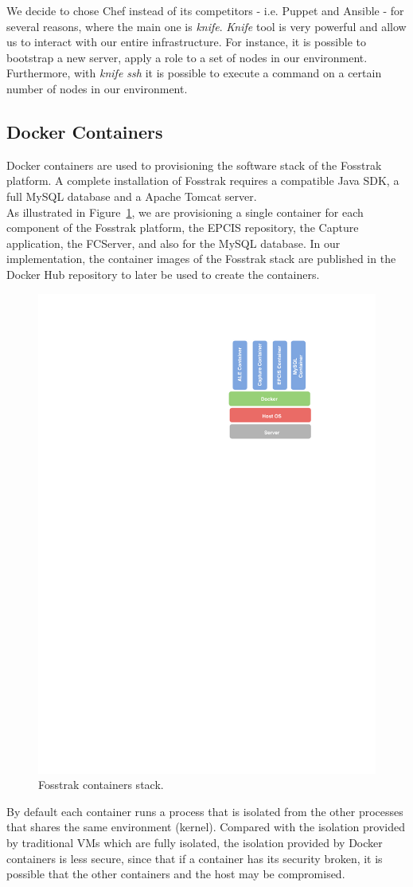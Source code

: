 We decide to chose Chef instead of its competitors - i.e. Puppet and Ansible - for several
reasons, where the main one is \textit{knife}. \textit{Knife} tool is very powerful and allow us to
interact with our entire infrastructure. For instance, it is possible to bootstrap a new server,
apply a role to a set of nodes in our environment. Furthermore, with \textit{knife ssh} it is
possible to execute a command on a certain number of nodes in our environment.\\

\subsection{Docker Containers}
\label{sub:impl_docker}
Docker containers are used to provisioning the software stack of the Fosstrak platform. A complete
installation of Fosstrak requires a compatible Java \gls{SDK}, a full MySQL database and a Apache Tomcat
server.\\

As illustrated in Figure~\ref{fig:impl_containers}, we are provisioning a single container for each
component of the Fosstrak platform, the \gls{EPCIS} repository, the Capture application, the \gls{FCServer},
and also for the MySQL database. In our implementation, the container images of the Fosstrak stack
are published in the Docker Hub repository to later be used to create the containers.\\

\begin{figure}[!ht]
  \centering
  \includegraphics[width=.3\textwidth]{./images/docker-stack}
  \caption[Fosstrak containers stack.]{Fosstrak containers stack.}
  \label{fig:impl_containers}
\end{figure}

By default each container runs a process that is isolated from the other processes that shares the same
environment (kernel). Compared with the isolation provided by traditional \glspl{VM} which are fully
isolated, the isolation provided by Docker containers is less secure, since that if a container has
its security broken, it is possible that the other containers and the host may be compromised.\\

